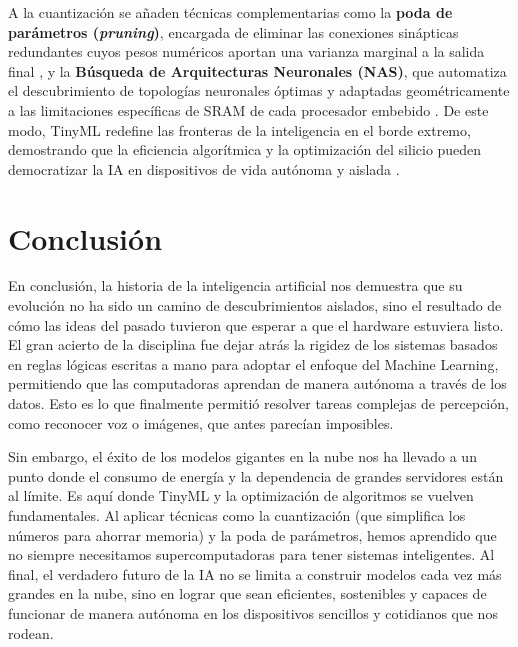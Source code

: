 \documentclass[12pt, a4paper]{article}
\begin{document}
A la cuantización se añaden técnicas complementarias como la \textbf{poda de parámetros (\textit{pruning})}, encargada de eliminar las conexiones sinápticas redundantes cuyos pesos numéricos aportan una varianza marginal a la salida final \parencite{somvanshi2025tiny}, y la \textbf{Búsqueda de Arquitecturas Neuronales (NAS)}, que automatiza el descubrimiento de topologías neuronales óptimas y adaptadas geométricamente a las limitaciones específicas de SRAM de cada procesador embebido \parencite{capogrosso2023machine, somvanshi2025tiny}. De este modo, TinyML redefine las fronteras de la inteligencia en el borde extremo, demostrando que la eficiencia algorítmica y la optimización del silicio pueden democratizar la IA en dispositivos de vida autónoma y aislada \parencite{somvanshi2025tiny, ray2022review}.

\section{Conclusión}

En conclusión, la historia de la inteligencia artificial nos demuestra que su evolución no ha sido un camino de descubrimientos aislados, sino el resultado de cómo las ideas del pasado tuvieron que esperar a que el hardware estuviera listo. El gran acierto de la disciplina fue dejar atrás la rigidez de los sistemas basados en reglas lógicas escritas a mano para adoptar el enfoque del Machine Learning, permitiendo que las computadoras aprendan de manera autónoma a través de los datos. Esto es lo que finalmente permitió resolver tareas complejas de percepción, como reconocer voz o imágenes, que antes parecían imposibles.

Sin embargo, el éxito de los modelos gigantes en la nube nos ha llevado a un punto donde el consumo de energía y la dependencia de grandes servidores están al límite. Es aquí donde TinyML y la optimización de algoritmos se vuelven fundamentales. Al aplicar técnicas como la cuantización (que simplifica los números para ahorrar memoria) y la poda de parámetros, hemos aprendido que no siempre necesitamos supercomputadoras para tener sistemas inteligentes. Al final, el verdadero futuro de la IA no se limita a construir modelos cada vez más grandes en la nube, sino en lograr que sean eficientes, sostenibles y capaces de funcionar de manera autónoma en los dispositivos sencillos y cotidianos que nos rodean.

\newpage

\printbibliography
\end{document}
